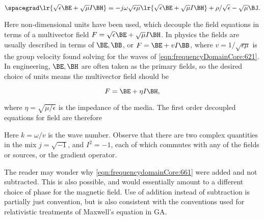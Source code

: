 \begin{equation}\label{eqn:frequencyDomainCore:701}
\spacegrad \lr{ \sqrt{\epsilon} \BE + \sqrt{\mu} I \BH } = -j \omega \sqrt{\epsilon\mu} \lr{ \sqrt{\epsilon} \BE + \sqrt{\mu} I \BH }
+ \rho/\sqrt{\epsilon} -\sqrt{\mu} \BJ.
\end{equation}

Here non-dimensional units have been used, which decouple the field equations in terms of a multivector field \( F = \sqrt{\epsilon} \BE + \sqrt{\mu} I \BH \).
In physics the fields are usually described in terms of \( \BE, \BB \), or \( F = \BE + v I \BB \), where \( v = 1/\sqrt{\epsilon\mu} \) is the group velocity found solving for the waves of \cref{eqn:frequencyDomainCore:621}.  In engineering, \( \BE, \BH \) are often taken as the primary fields, so the desired choice of units means the multivector field should be

\begin{equation}\label{eqn:frequencydomainCore:80}
F = \BE + \eta I \BH,
\end{equation}

where \( \eta = \sqrt{\mu/\epsilon} \) is the impedance of the media.  The first order decoupled equations for field are therefore


Here \( k = \omega/v \) is the wave number.
Observe that there are two complex quantities in the mix \( j = \sqrt{-1} \), and \( I^2 = -1 \), each of which commutes with any of the fields or sources, or the gradient operator.

The reader may wonder why \cref{eqn:frequencydomainCore:661} were added and not subtracted.  This is also possible, and would essentially amount to a different choice of phase for the magnetic field.  Use of addition instead of subtraction is partially just convention, but is also consistent with the conventions used for relativistic treatments of Maxwell's equation in GA.
